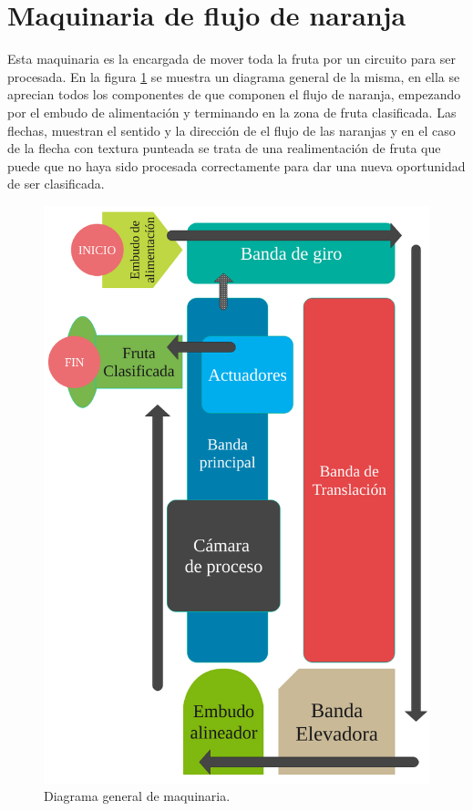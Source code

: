 \documentclass[twoside,spanish,ESP,MSc]{plantillaLabUPV}
\theoremstyle{definition}
\begin{document}
\section{Maquinaria de flujo de naranja}
Esta maquinaria es la encargada de mover toda la fruta por un circuito para ser procesada. En la figura \ref{fig:diagramamaquina} se muestra un diagrama general de la misma, en ella se aprecian todos los componentes de que componen el flujo de naranja, empezando por el embudo de alimentación y terminando en la zona de fruta clasificada. Las flechas, muestran el sentido y la dirección de el flujo de las naranjas y en el caso de la flecha con textura punteada se trata de una realimentación de fruta que puede que no haya sido procesada correctamente para dar una nueva oportunidad de ser clasificada.  

\begin{figure}[h]
	\centering
	\includegraphics[scale=0.3]{edrawimas/diagramamaquina}
	\caption{Diagrama general de maquinaria.}
	\label{fig:diagramamaquina}
\end{figure}
\end{document}
